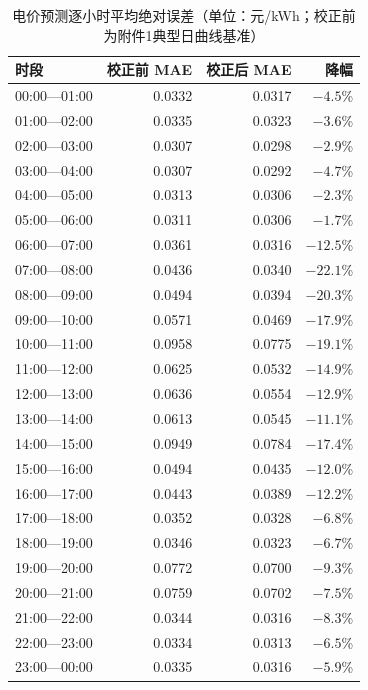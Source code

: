 \begin{table}[H]
\centering
{}
\begin{tabular}{lrrr}
\toprule
时段 & 校正前 MAE & 校正后 MAE & 降幅 \\
\midrule00:00—01:00 & 0.0332 & 0.0317 & $-4.5$\% \\
01:00—02:00 & 0.0335 & 0.0323 & $-3.6$\% \\
02:00—03:00 & 0.0307 & 0.0298 & $-2.9$\% \\
03:00—04:00 & 0.0307 & 0.0292 & $-4.7$\% \\
04:00—05:00 & 0.0313 & 0.0306 & $-2.3$\% \\
05:00—06:00 & 0.0311 & 0.0306 & $-1.7$\% \\
06:00—07:00 & 0.0361 & 0.0316 & $-12.5$\% \\
07:00—08:00 & 0.0436 & 0.0340 & $-22.1$\% \\
08:00—09:00 & 0.0494 & 0.0394 & $-20.3$\% \\
09:00—10:00 & 0.0571 & 0.0469 & $-17.9$\% \\
10:00—11:00 & 0.0958 & 0.0775 & $-19.1$\% \\
11:00—12:00 & 0.0625 & 0.0532 & $-14.9$\% \\
12:00—13:00 & 0.0636 & 0.0554 & $-12.9$\% \\
13:00—14:00 & 0.0613 & 0.0545 & $-11.1$\% \\
14:00—15:00 & 0.0949 & 0.0784 & $-17.4$\% \\
15:00—16:00 & 0.0494 & 0.0435 & $-12.0$\% \\
16:00—17:00 & 0.0443 & 0.0389 & $-12.2$\% \\
17:00—18:00 & 0.0352 & 0.0328 & $-6.8$\% \\
18:00—19:00 & 0.0346 & 0.0323 & $-6.7$\% \\
19:00—20:00 & 0.0772 & 0.0700 & $-9.3$\% \\
20:00—21:00 & 0.0759 & 0.0702 & $-7.5$\% \\
21:00—22:00 & 0.0344 & 0.0316 & $-8.3$\% \\
22:00—23:00 & 0.0334 & 0.0313 & $-6.5$\% \\
23:00—00:00 & 0.0335 & 0.0316 & $-5.9$\% \\
\bottomrule
\end{tabular}
\caption{电价预测逐小时平均绝对误差（单位：元/kWh；校正前为附件1典型日曲线基准）}
\label{tab:c-hour}
\end{table}
